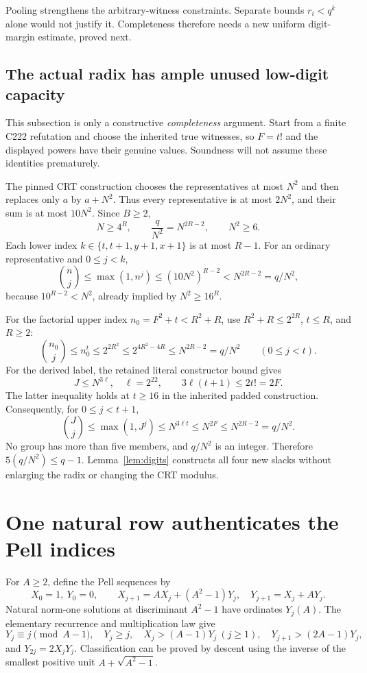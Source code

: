 \documentclass[11pt,letterpaper]{article}
\theoremstyle{definition}\newtheorem{definition}[theorem]{Definition}
\theoremstyle{remark}\newtheorem{remark}[theorem]{Remark}
\begin{document}
Pooling strengthens the arbitrary-witness constraints. Separate bounds
\(r_i<q^k\) alone would not justify it. Completeness therefore needs a
new uniform digit-margin estimate, proved next.

\subsection{The actual radix has ample unused low-digit capacity}

This subsection is only a constructive \emph{completeness} argument.
Start from a finite C222 refutation and choose the inherited true
witnesses, so \(F=t!\) and the displayed powers have their genuine
values. Soundness will not assume these identities prematurely.

The pinned CRT construction chooses the representatives at most \(N^2\)
and then replaces only \(a\) by \(a+N^2\). Thus every representative
is at most \(2N^2\), and their sum is at most \(10N^2\). Since
\(B\ge2\),
\[
 N\ge4^R,\qquad \frac q{N^2}=N^{2R-2},\qquad N^2\ge6.
\]
Each lower index \(k\in\{t,t+1,y+1,x+1\}\) is at most \(R-1\).
For an ordinary representative and \(0\le j<k\),
\[
 \binom nj\le\max(1,n^j)
 \le(10N^2)^{R-2}<N^{2R-2}=q/N^2,
\]
because \(10^{R-2}<N^2\), already implied by \(N^2\ge16^R\).

For the factorial upper index \(n_0=F^2+t<R^2+R\), use
\(R^2+R\le2^{2R}\), \(t\le R\), and \(R\ge2\):
\[
 \binom{n_0}{j}\le n_0^t\le2^{2R^2}
       \le2^{4R^2-4R}\le N^{2R-2}=q/N^2
       \qquad(0\le j<t).
\]
For the derived label, the retained literal constructor bound gives
\[
 J\le N^{3\ell},\quad \ell=2^{22},\qquad
 3\ell(t+1)\le2t!=2F.
\]
The latter inequality holds at \(t\ge16\) in the inherited padded
construction. Consequently, for \(0\le j<t+1\),
\[
 \binom Jj\le\max(1,J^j)\le N^{3\ell t}
       \le N^{2F}\le N^{2R-2}=q/N^2.
\]
No group has more than five members, and \(q/N^2\) is an integer.
Therefore \(5(q/N^2)\le q-1\). Lemma~\ref{lem:digits} constructs all
four new slacks without enlarging the radix or changing the CRT modulus.

\section{One natural row authenticates the Pell indices}
\label{sec:cap}

For \(A\ge2\), define the Pell sequences by
\[
 X_0=1,\ Y_0=0,\qquad
 X_{j+1}=AX_j+(A^2-1)Y_j,\quad Y_{j+1}=X_j+AY_j.
\]
Natural norm-one solutions at discriminant \(A^2-1\) have ordinates
\(Y_j(A)\). The elementary recurrence and multiplication law give
\[
 Y_j\equiv j\pmod{A-1},\quad Y_j\ge j,\quad
 X_j>(A-1)Y_j\ (j\ge1),\quad
 Y_{j+1}>(2A-1)Y_j,
\]
and \(Y_{2j}=2X_jY_j\). Classification can be proved by descent using
the inverse of the smallest positive unit \(A+\sqrt{A^2-1}\).
\end{document}
